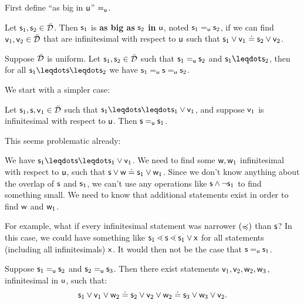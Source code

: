 \documentclass{article}
\begin{document}
First define ``as big in $\stmt[u]$'' $\equ$.

\begin{defn}
Let $\stmt_1, \stmt_2 \in \tdomain$. Then $\stmt_1$ is \textbf{as big as} $\stmt_2$ \textbf{in} $\stmt[u]$, noted $\stmt_1 \equ \stmt_2$, if we can find $\stmt[v]_1, \stmt[v]_2 \in \tdomain$ that are infinitesimal with respect to $\stmt[u]$ such that $\stmt_1 \OR \stmt[v]_1 \eqgran \stmt_2 \OR \stmt[v]_2$.
\end{defn}

\begin{prop}
Suppose $\tdomain$ is uniform. Let $\stmt_1, \stmt_2 \in \tdomain$ such that $\stmt_1 \equ \stmt_2$ and $\stmt_1 \finer \stmt_2$, then for all $\stmt_1 \finer \stmt \finer \stmt_2$ we have $\stmt_1 \equ \stmt \equ \stmt_2$.
\end{prop}

We start with a simpler case:

\begin{prop}
Let $\stmt_1,\stmt,\stmt[v]_1\in\tdomain$ such that $\stmt_1\finer\stmt\finer\stmt_1\OR\stmt[v]_1$, and suppose $\stmt[v]_1$ is infinitesimal with respect to $\stmt[u]$. Then $\stmt\equ\stmt_1$. 
\end{prop}

This seems problematic already:

We have $\stmt_1\finer\stmt\finer\stmt_1\OR\stmt[v]_1$. We need to find some $\stmt[w],\stmt[w]_1$ infinitesimal with respect to $\stmt[u]$, such that $\stmt\OR\stmt[w]\eqgran\stmt_1\OR\stmt[w]_1$. Since we don't know anything about the overlap of $\stmt$ and $\stmt_1$, we can't use any operations like $\stmt\AND\NOT\stmt_1$ to find something small. We need to know that additional statements exist in order to find $\stmt[w]$ and $\stmt[w]_1$. 

For example, what if every infinitesimal statement was narrower $(\narrower)$ than $\stmt$? In this case, we could have something like $\stmt_1\sfiner\stmt\sfiner\stmt_1\OR\stmt[x]$ for all statements (including all infinitesimals) $\stmt[x]$. It would then not be the case that $\stmt\equ\stmt_1$. 





\begin{prop}
Suppose $\stmt_1\equ\stmt_2$ and $\stmt_2\equ\stmt_3$. Then there exist statements  $\stmt[v]_1,\stmt[v]_2,\stmt[w]_2,\stmt[w]_3$, infinitesimal in $\stmt[u]$, such that:
$$
\stmt_1\OR\stmt[v]_1\OR\stmt[w]_2 \eqgran \stmt_2\OR\stmt[v]_2\OR\stmt[w]_2 \eqgran \stmt_3\OR\stmt[w]_3\OR\stmt[v]_2.
$$
\end{prop}
\end{document}
